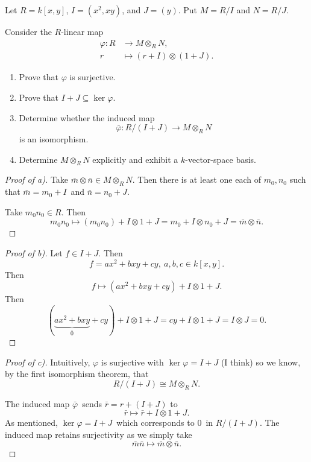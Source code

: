 \documentclass[11pt]{article}
\begin{document}
\begin{prob*}
    Let \(R=k[x,y]\), \(I=(x^2,xy)\), and \(J=(y)\).
    Put \(M=R/I\) and \(N=R/J\).

    Consider the \(R\)-linear map
    \[
        \begin{aligned}
            \varphi:R&\longrightarrow M\otimes_R N,\\
            r&\longmapsto (r+I)\otimes(1+J).
        \end{aligned}
    \]

    \begin{enumerate}[label=\alph*)]
        \item Prove that \(\varphi\) is surjective.
        \item Prove that \(I+J\subseteq\ker\varphi\).
        \item Determine whether the induced map
        \[
            \bar\varphi:R/(I+J)
                \longrightarrow M\otimes_R N
        \]
        is an isomorphism.
        \item Determine \(M\otimes_R N\) explicitly
        and exhibit a \(k\)-vector-space basis.
    \end{enumerate}
\end{prob*}
\begin{proof}[Proof of a)]
    Take $\bar m \otimes \bar n \in M \otimes_R N$. 
    Then there is at least one each of 
    $m_0,n_0$ such that $\bar m = m_0 + I$ and 
    $\bar n = n_0 + J$. 

    Take $m_0n_0 \in R$. Then 
    \[
        m_0n_0 \mapsto (m_0n_0) + I \otimes 1 + J 
        = m_0 + I \otimes n_0 + J 
        = \bar m \otimes \bar n. 
    \]
\end{proof}
\begin{proof}[Proof of b)]
    Let $f \in I + J$. 
    Then 
    \[
        f = ax^2 + bxy + cy, \ a,b,c \in k[x,y].  
    \]
    Then 
    \[
        f \mapsto 
        (ax^2 + bxy + cy) + I \otimes 1 + J. 
    \]
    Then 
    \[
        (\underbrace{ax^2 + bxy}_{\bar 0} + cy) + I \otimes 1 + J 
        = cy + I \otimes 1 + J 
        = I \otimes J = 0.  
    \]
\end{proof}  
\begin{proof}[Proof of c)]
    Intuitively, $\varphi$ is surjective with 
    $\ker \varphi = I + J$ (I think) so we know, by the 
    first isomorphism theorem, that 
    \[
        R/(I + J) \cong M \otimes_R N. 
    \]

    The induced map $\bar \varphi$ sends 
    $\bar r = r + (I + J)$ to 
    \[
        \bar r \mapsto \bar r + I \otimes 1 + J.  
    \]
    As mentioned, $\ker \varphi = I + J$ which corresponds to 
    $0$ in $R/(I + J)$. The induced map retains surjectivity 
    as we simply take 
    \[
        \bar m \bar n \mapsto \bar m \otimes \bar n. 
    \]
\end{proof}
\end{document}
